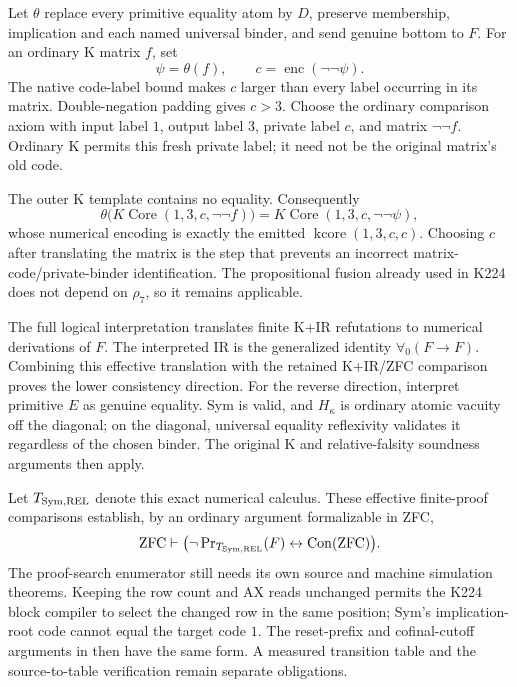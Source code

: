 Let $\theta$ replace every primitive equality atom by $D$, preserve
membership, implication and each named universal binder, and send genuine
bottom to $F$.  For an ordinary K matrix $f$, set
\[
 \psi=\theta(f),\qquad c=\operatorname{enc}(\neg\neg\psi).
\]
The native code-label bound makes $c$ larger than every label occurring
in its matrix.  Double-negation padding gives $c>3$.  Choose the ordinary
comparison axiom with input label $1$, output label $3$, private label
$c$, and matrix $\neg\neg f$.  Ordinary K permits this fresh private
label; it need not be the original matrix's old code.

The outer K template contains no equality.  Consequently
\[
 \theta\bigl(K\operatorname{Core}(1,3,c,\neg\neg f)\bigr)
 =K\operatorname{Core}(1,3,c,\neg\neg\psi),
\]
whose numerical encoding is exactly the emitted
$\operatorname{kcore}(1,3,c,c)$.  Choosing $c$ after translating the matrix
is the step that prevents an incorrect matrix-code/private-binder
identification.  The propositional fusion already used in K224 does not
depend on $\rho_7$, so it remains applicable.

The full logical interpretation translates finite K+IR refutations to
numerical derivations of $F$.  The interpreted IR is the generalized
identity $\forall_0(F\to F)$.  Combining this effective translation with
the retained K+IR/ZFC comparison proves the lower consistency direction.
For the reverse direction, interpret primitive $E$ as genuine equality.
Sym is valid, and $H_\kappa$ is ordinary atomic vacuity off the diagonal;
on the diagonal, universal equality reflexivity validates it regardless
of the chosen binder.  The original K and relative-falsity soundness
arguments then apply.

Let $T_{\rm Sym,REL}$ denote this exact numerical calculus.  These
effective finite-proof comparisons establish, by an ordinary argument
formalizable in ZFC,
\[
 \mathrm{ZFC}\vdash
 \bigl(\neg\operatorname{Pr}_{T_{\rm Sym,REL}}(F)
       \leftrightarrow \operatorname{Con}(\mathrm{ZFC})\bigr).
\]
The proof-search enumerator still needs its own source and machine
simulation theorems.  Keeping the row count and AX reads unchanged permits
the K224 block compiler to select the changed row in the same position;
Sym's implication-root code cannot equal the target code $1$.  The
reset-prefix and cofinal-cutoff arguments in
 then have the same form.
A measured transition table and the source-to-table verification remain
separate obligations.

